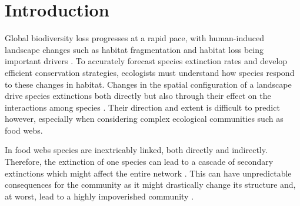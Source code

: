 \documentclass[11pt]{article}
\begin{document}
\newpage
\begin{abstract}
  \noindent \normalsize We develop a novel approach to trophic metacommunities which allows us to explore how progressive habitat loss affects food webs. Our method combines classic metapopulation models on fragmented landscapes with a Bayesian network representation of trophic interactions for calculating local extinction rates. This means we can repurpose known results from classic metapopulation theory for trophic metacommunities, such as ranking the habitat patches of the landscape with respect to their importance to the persistence of the metacommunity as a whole. We use this to study the effects of habitat loss, both on model communities and the plant-mammal Serengeti food web dataset as a case study. Combining straightforward parameterizability with computational efficiency, our method permits the analysis of species-rich food webs over large landscapes, with hundreds or even thousands of species and habitat patches, while still retaining much of the flexibility of explicit dynamical models.
\end{abstract}

\newpage


\section{Introduction} \label{sec:intro}

Global biodiversity loss progresses at a rapid pace, with human-induced landscape changes such as habitat fragmentation and habitat loss being important drivers \citep{Tylianakis2008, Haddad2015}. To accurately forecast species extinction rates and develop efficient conservation strategies, ecologists must understand how species respond to these changes in habitat. Changes in the spatial configuration of a landscape drive species extinctions both directly but also through their effect on the interactions among species \citep{Tylianakis2008, Valiente-Banuet2015}. Their direction and extent is difficult to predict however, especially when considering complex ecological communities such as food webs.

In food webs species are inextricably linked, both directly and indirectly. Therefore, the extinction of one species can lead to a cascade of secondary extinctions which might affect the entire network \citep{EbenmanJonsson2005, Dunne2009}. This can have unpredictable consequences for the community as it might drastically change its structure and, at worst, lead to a highly impoverished community \citep{EklofEbenman2006, Dunne2009}.
\end{document}
